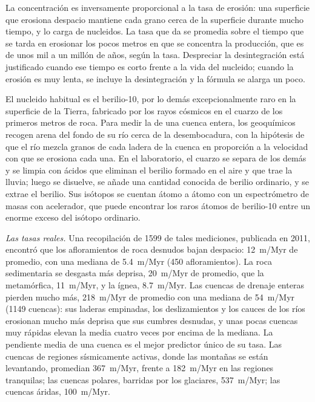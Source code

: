 La concentración es inversamente proporcional a la tasa de erosión: una superficie que erosiona despacio mantiene cada grano cerca de la superficie durante mucho
tiempo, y lo carga de nucleidos. La tasa que da se promedia sobre el tiempo que se tarda en erosionar los pocos metros en que se concentra la producción, que es
de unos mil a un millón de años, según la tasa. Despreciar la desintegración está justificado cuando ese tiempo es corto frente a la vida del nucleido; cuando la
erosión es muy lenta, se incluye la desintegración y la fórmula se alarga un poco.

\begin{inthelab}
El nucleido habitual es el berilio-10, por lo demás excepcionalmente raro en la superficie de la Tierra, fabricado por los rayos cósmicos en el cuarzo de los
primeros metros de roca. Para medir la  de una cuenca entera, los geoquímicos recogen arena del fondo de su río cerca de la desembocadura, con la
hipótesis de que el río mezcla granos de cada ladera de la cuenca en proporción a la velocidad con que se erosiona cada una. En el laboratorio, el cuarzo se separa de
los demás  y se limpia con ácidos que eliminan el berilio formado en el aire y que trae la lluvia; luego se disuelve, se añade una cantidad conocida de berilio
ordinario, y se extrae el berilio. Sus isótopos se cuentan átomo a átomo con un espectrómetro de masas con acelerador, que puede encontrar los raros átomos de
berilio-10 entre un enorme exceso del isótopo ordinario.
\end{inthelab}

\emph{Las tasas reales.} Una recopilación de \num{1599} de tales mediciones, publicada en 2011, encontró que los afloramientos de roca desnudos bajan despacio:
\qty{12}{m/Myr} de promedio, con una mediana de \qty{5.4}{m/Myr} (450 afloramientos). La roca sedimentaria se desgasta más deprisa, \qty{20}{m/Myr} de promedio,
que la metamórfica, \qty{11}{m/Myr}, y la ígnea, \qty{8.7}{m/Myr}. Las cuencas de drenaje enteras pierden mucho más, \qty{218}{m/Myr} de promedio con una
mediana de \qty{54}{m/Myr} (\num{1149} cuencas): sus laderas empinadas, los deslizamientos y los cauces de los ríos erosionan mucho más deprisa que sus cumbres
desnudas, y unas pocas cuencas muy rápidas elevan la media cuatro veces por encima de la mediana. La pendiente media de una cuenca es el mejor predictor único de su
tasa. Las cuencas de regiones sísmicamente activas, donde las montañas se están levantando, promedian \qty{367}{m/Myr}, frente a \qty{182}{m/Myr} en las regiones tranquilas;
las cuencas polares, barridas por los glaciares, \qty{537}{m/Myr}; las cuencas áridas, \qty{100}{m/Myr}.

